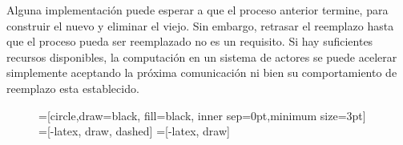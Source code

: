 
Alguna implementación puede esperar a que el proceso anterior termine, para construir el nuevo y eliminar el viejo. Sin embargo, retrasar el reemplazo hasta que el proceso pueda ser reemplazado no es un requisito. Si hay suficientes recursos disponibles, la computación en un sistema de actores se puede acelerar simplemente aceptando la próxima comunicación ni bien su comportamiento de reemplazo esta establecido.

\begin{figure}[H]
\centering

=[circle,draw=black, fill=black, inner sep=0pt,minimum size=3pt]
=[-latex, draw, dashed]
=[-latex, draw]

\begin{subfigure}{.5\textwidth}
\centering
{}

\caption{  }
\label{fig:actores:crecion:a}
\end{subfigure}%
\begin{subfigure}{.5\textwidth}

\centering
{}
\end{subfigure}
\end{figure}
